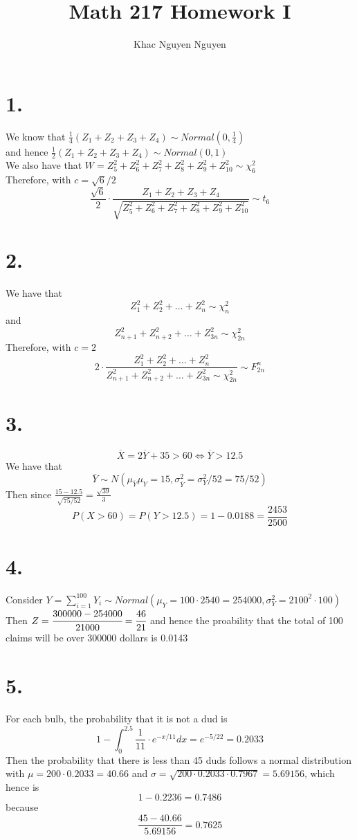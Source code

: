 \documentclass[11pt]{article}
\title{\textbf{Math 217 Homework I}}
\author{Khac Nguyen Nguyen}
\date{}
\begin{document}
\section*{1.}
We know that $\frac{1}{4} \left(Z_1 + Z_2 + Z_3 + Z_4\right) \sim Normal(0,\frac{1}{4})$ \\
and hence $\frac{1}{2} \left(Z_1 + Z_2 + Z_3 + Z_4\right) \sim Normal(0,1)$ \\
We also have that $W=Z_5^2 + Z_6^2 + Z_7^2 + Z_8^2 + Z_9^2 + Z_{10}^2 \sim \chi_6^2$ \\
Therefore, with $c=\sqrt{6}/2$
\[
    \frac{\sqrt{6}}{2}\cdot \frac{Z_1 + Z_2 + Z_3 + Z_4}{\sqrt{Z_5^2 + Z_6^2 + Z_7^2 + Z_8^2 + Z_9^2 + Z_{10}^2}} \sim t_6
\]
\pagebreak
\section*{2.}
We have that
\[
    Z_1^2 + Z_2^2 + \ldots + Z_n^2 \sim \chi^2_{n}
\]
and
\[
    Z_{n+1}^2 + Z_{n+2}^2 + \ldots + Z_{3n}^2 \sim \chi^2_{2n}
\]
Therefore, with $c=2$
\[
    2 \cdot \frac{Z_1^2 + Z_2^2 + \ldots + Z_n^2}{Z_{n+1}^2 + Z_{n+2}^2 + \ldots + Z_{3n}^2 \sim \chi^2_{2n}} \sim F_{2n}^n
\]
\pagebreak
\section*{3.}
\[
    \overline{X} = 2\overline{Y} + 35 > 60 \iff \overline{Y} > 12.5
\]
We have that 
\[
    \overline{Y} \sim N(\mu_{\overline{Y}}\mu_Y = 15, \sigma^2_{\overline{Y}} = \sigma_Y^2/52 = 75/52)    
\]
Then since $\frac{15-12.5}{\sqrt{75/52}} = \frac{\sqrt{39}}{3}$
\[
    P(X>60) = P(Y>12.5) =  1- 0.0188 = \frac{2453}{2500}
\]
\pagebreak
\section*{4.}
Consider $Y = \sum_{i=1}^{100} Y_i \sim Normal(\mu_Y = 100 \cdot 2540 = 254000, \sigma^2_Y = 2100^2\cdot 100)$
Then $Z = \cfrac{300000-254000}{21000} = \cfrac{46}{21} $ and hence the proability that the total of 100 claims will be over 300000 dollars is 0.0143
\pagebreak
\section*{5.}
For each bulb, the probability that it is not a dud is
\[
    1 - \int_0^{2.5} \frac{1}{11} \cdot e^{-x/11} dx = e^{-5/22} = 0.2033
\]
Then the probability that there is less than 45 duds follows a normal distribution with $\mu = 200 \cdot 0.2033 = 40.66$
and $\sigma = \sqrt{200 \cdot 0.2033 \cdot 0.7967} = 5.69156$, which hence is 
\[
    1 - 0.2236 = 0.7486
\]
because 
\[
    \frac{45- 40.66}{5.69156} = 0.7625 
\]
\pagebreak
\end{document}
